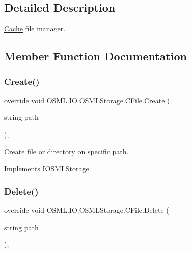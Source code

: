 \subsection{Detailed Description}
\mbox{\hyperlink{namespaceOSML_1_1Cache}{Cache}} file manager. 



\subsection{Member Function Documentation}
\mbox{\label{classOSML_1_1IO_1_1OSMLStorage_1_1CFile_a1854c3a8403c27dda2bce815c0000697}} 
\subsubsection{\texorpdfstring{Create()}{Create()}}
{\footnotesize\ttfamily override void O\+S\+M\+L.\+I\+O.\+O\+S\+M\+L\+Storage.\+C\+File.\+Create (\begin{DoxyParamCaption}\item[{string}]{path }\end{DoxyParamCaption})\hspace{0.3cm}{\ttfamily [inline]}, {\ttfamily [virtual]}}



Create file or directory on specific path. 



Implements \mbox{\hyperlink{classIOSMLStorage_a95cdf051ac2045a9cfa4fb29a78b26c0}{I\+O\+S\+M\+L\+Storage}}.

\mbox{\label{classOSML_1_1IO_1_1OSMLStorage_1_1CFile_a23dcf0c1471b9eb59e43b46ce7e6fa48}} 
\subsubsection{\texorpdfstring{Delete()}{Delete()}}
{\footnotesize\ttfamily override void O\+S\+M\+L.\+I\+O.\+O\+S\+M\+L\+Storage.\+C\+File.\+Delete (\begin{DoxyParamCaption}\item[{string}]{path }\end{DoxyParamCaption})\hspace{0.3cm}{\ttfamily [inline]}, {\ttfamily [virtual]}}



